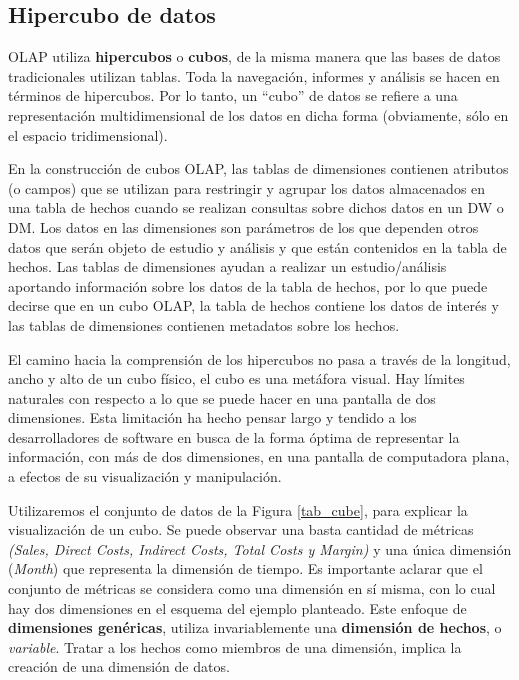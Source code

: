 \documentclass[a4paper,11pt]{article}
\begin{document}
    
    \subsection{Hipercubo de datos}
    
    OLAP utiliza \textbf{hipercubos} o \textbf{cubos}, de la misma manera que las bases de datos tradicionales utilizan tablas.
    Toda la navegación, informes y análisis se hacen en términos de hipercubos.
    Por lo tanto, un ``cubo'' de datos se refiere a una representación multidimensional de los datos en dicha forma (obviamente, sólo en el espacio tridimensional).
    
    En la construcción de cubos OLAP, las tablas de dimensiones contienen atributos (o campos) que se utilizan para restringir y agrupar
    los datos almacenados en una tabla de hechos cuando se realizan consultas sobre dichos datos en un DW o DM. Los datos en las dimensiones son parámetros
    de los que dependen otros datos que serán objeto de estudio y análisis y que están contenidos en la tabla de hechos. Las tablas de dimensiones ayudan a
    realizar un estudio/análisis aportando información sobre los datos de la tabla de hechos, por lo que puede decirse que en un cubo OLAP, la tabla de
    hechos contiene los datos de interés y las tablas de dimensiones contienen metadatos sobre los hechos.

    El camino hacia la comprensión de los hipercubos no pasa a través de la longitud, ancho y alto de un cubo físico, el cubo es una metáfora visual. Hay
    límites naturales con respecto a lo que se puede hacer en una pantalla de dos dimensiones. Esta limitación ha hecho pensar largo y tendido a los
    desarrolladores de software en busca de la forma óptima de representar la información, con más de dos dimensiones, en una pantalla de computadora plana,
    a efectos de su visualización y manipulación.
    
    Utilizaremos el conjunto de datos de la Figura \ref{tab_cube}, para explicar la visualización de un cubo. Se puede observar una basta cantidad de
    métricas \textit{(Sales, Direct Costs, Indirect Costs, Total Costs y Margin)} y una única dimensión (\textit{Month}) que representa la dimensión de tiempo.
    Es importante aclarar que el conjunto de métricas se considera como una dimensión en sí misma, con lo cual hay dos dimensiones en el esquema del ejemplo planteado.
    Este enfoque de \textbf{dimensiones genéricas}, utiliza invariablemente una \textbf{dimensión de hechos}, o \textit{variable}.
    Tratar a los hechos como miembros de una dimensión, implica la creación de una dimensión de datos. 
    
\end{document}
